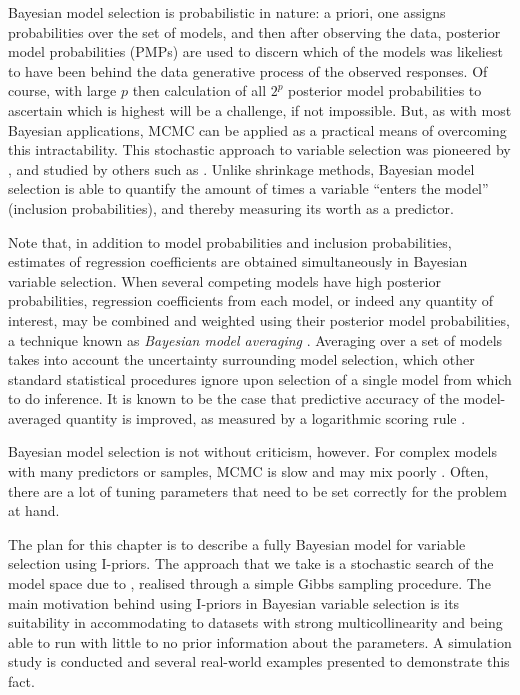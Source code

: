 \documentclass[showframe,11pt,twoside,openright]{report}
\begin{document}
Bayesian model selection is probabilistic in nature: a priori, one assigns probabilities over the set of models, and then after observing the data, posterior model probabilities (PMPs) are used to discern which of the models was likeliest to have been behind the data generative process of the observed responses.
Of course, with large  $p$ then calculation of all $2^p$ posterior model probabilities to ascertain which is highest will be a challenge, if not impossible.
But, as with most Bayesian applications, MCMC can be applied as a practical means of overcoming this intractability.
This stochastic approach to variable selection was pioneered by \citet{George1993}, and studied by others such as \citet{Kuo1998,dellaportas2002bayesian,Ntzoufras2008}.
Unlike shrinkage methods, Bayesian model selection is able to quantify the amount of times a variable ``enters the model'' (inclusion probabilities), and thereby measuring its worth as a  predictor.

Note that, in addition to model probabilities and inclusion probabilities, estimates of regression coefficients are obtained simultaneously in Bayesian variable selection.
When several competing models have high posterior probabilities, regression coefficients from each model, or indeed any quantity of interest, may be combined and weighted using their posterior model probabilities, a technique known as \emph{Bayesian model averaging} \citep{madigan1994model,hoeting1999bayesian}.
Averaging over a set of models takes into account the uncertainty surrounding model selection, which other standard statistical procedures ignore upon selection of a single model from which to do inference.
It is known to be the case that predictive accuracy of the model-averaged quantity is improved, as measured by a logarithmic scoring rule \citep{raftery1997bayesian}.

Bayesian model selection is not without criticism, however.
For complex models with many predictors or samples, MCMC is slow and may mix poorly \citep{OHara2009}.
Often, there are a lot of tuning parameters that need to be set correctly for the problem at hand.

The plan for this chapter is to describe a fully Bayesian model for variable selection using I-priors. 
The approach that we take is a stochastic search of the model space due to \citet{Kuo1998}, realised through a simple Gibbs sampling procedure.
The main motivation behind using I-priors in Bayesian variable selection is its suitability in accommodating to datasets with strong multicollinearity and being able to run with little to no prior information about the parameters.
A simulation study is conducted and several real-world examples presented to demonstrate this fact. 
\end{document}
